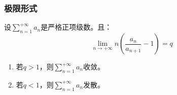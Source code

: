 \subsubsection{极限形式}
\begin{theorem}
	设$\sum\limits_{n=1}^{+\infty}a_n$是严格正项级数。且：
	\begin{equation*}
		\lim_{n\to+\infty} n\left(\frac{a_{n}}{a_{n+1}}-1\right)=q
	\end{equation*}
	\begin{enumerate}
		\item 若$q>1$，则$\sum\limits_{n=1}^{+\infty}a_n$收敛。
		\item 若$q<1$，则$\sum\limits_{n=1}^{+\infty}a_n$发散。
	\end{enumerate}
\end{theorem}

